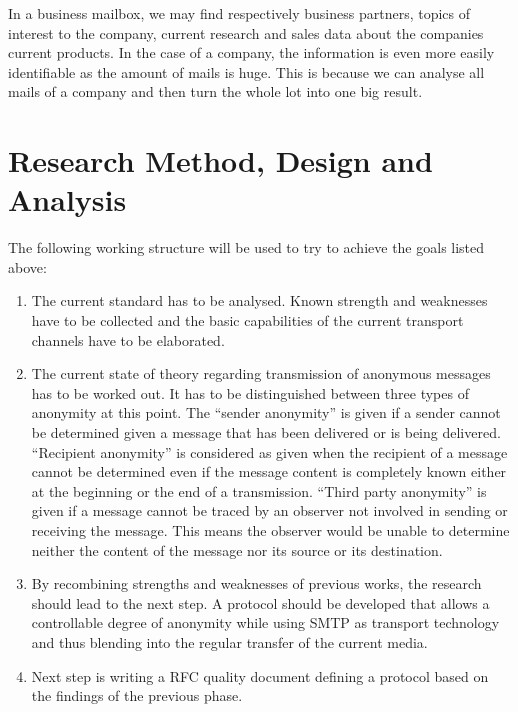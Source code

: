 \documentclass[twocolumn,a4paper,10pt,english]{scrartcl}
\begin{document}
In a business mailbox, we may find respectively business partners, topics of interest to the company, current research and sales data about the companies current products. In the case of a company, the information is even more easily identifiable as the amount of mails is huge. This is because we can analyse all mails of a company and then turn the whole lot into one big result.\par

\section{Research Method, Design and Analysis}
The following working structure will be used to try to achieve the goals listed above:\par
\begin{enumerate}
\item The current standard has to be analysed. Known strength and weaknesses have to be collected and the basic capabilities of the current transport channels have to be elaborated. \par

\item The current state of theory regarding transmission of anonymous messages has to be worked out. It has to be distinguished between three types of anonymity at this point. The ``sender anonymity'' is given if a sender cannot be determined given a message that has been delivered or is being delivered. ``Recipient anonymity'' is considered as given when the recipient of a message cannot be determined even if the message content is completely known either at the beginning or the end of a transmission. ``Third party anonymity'' is given if a message cannot be traced by an observer not involved in sending or receiving the message. This means the observer would be unable to determine neither the content of the message nor its source or its destination. \par

\item By recombining strengths and weaknesses of previous works, the research should lead to the next step. A protocol should be developed that allows a controllable degree of anonymity while using SMTP as transport technology and thus blending into the regular transfer of the current media. \par

\item Next step is writing a RFC quality document defining a protocol based on the findings of the previous phase. \par


\end{enumerate}
\end{document}
